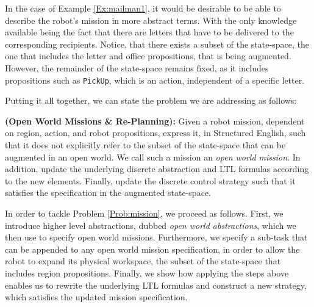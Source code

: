 In the case of Example \ref{Ex:mailman1}, it would be desirable to be able to describe the robot's mission in more abstract terms. With the only knowledge available being the fact that there are letters that have to be delivered to the corresponding recipients. Notice, that there exists a subset of the state-space, the one that includes the letter and office propositions, that is being augmented. However, the remainder of the state-space remains fixed, as it includes propositions such as \texttt{PickUp}, which is an action, independent of a specific letter. 

Putting it all together, we can state the problem we are addressing as follows:

\begin{myProblem}\label{Prob:mission}
	\textbf{(Open World Missions \& Re-Planning):} 
	Given a robot mission, dependent on region, action, and robot propositions, express it, in Structured English, such that it does not explicitly refer to the subset of the state-space that can be augmented in an open world. We call such a mission an \emph{open world mission}. In addition, update the underlying discrete abstraction and LTL formulas according to the new elements. Finally, update the discrete control strategy such that it satisfies the specification in the augmented state-space.
\end{myProblem}

In order to tackle Problem \ref{Prob:mission}, we proceed as follows. First, we introduce higher level abstractions, dubbed \emph{open world abstractions}, which we then use to specify open world missions. Furthermore, we specify a sub-task that can be appended to any open world mission specification, in order to allow the robot to expand its physical workspace, the subset of the state-space that includes region propositions. Finally, we  show how applying the steps above enables us to rewrite the underlying LTL formulas and construct a new strategy, which satisfies the updated mission specification.


